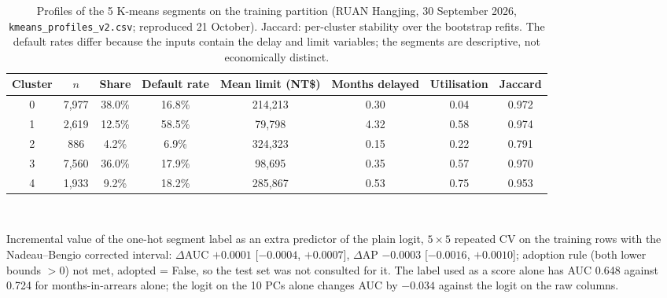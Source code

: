 \begin{table}[!htbp]
  \caption{Profiles of the 5 K-means segments on the training partition (RUAN Hangjing, 30 September 2026, \texttt{kmeans\_profiles\_v2.csv}; reproduced 21 October). Jaccard: per-cluster stability over the bootstrap refits. The default rates differ because the inputs contain the delay and limit variables; the segments are descriptive, not economically distinct.}
  \label{tab:a-kprofiles}
  \centering
  \small
  \setlength{\tabcolsep}{4pt}
  \begin{tabular}{@{}cccccccc@{}}
    \toprule
    Cluster & $n$ & Share & Default rate & Mean limit (NT\$) & Months delayed & Utilisation & Jaccard \\
    \midrule
    0 & 7,977 & 38.0\% & 16.8\% & 214,213 & 0.30 & 0.04 & 0.972 \\
    1 & 2,619 & 12.5\% & 58.5\% & 79,798 & 4.32 & 0.58 & 0.974 \\
    2 & 886 & 4.2\% & 6.9\% & 324,323 & 0.15 & 0.22 & 0.791 \\
    3 & 7,560 & 36.0\% & 17.9\% & 98,695 & 0.35 & 0.57 & 0.970 \\
    4 & 1,933 & 9.2\% & 18.2\% & 285,867 & 0.53 & 0.75 & 0.953 \\
    \bottomrule
  \end{tabular}
  \\[3pt]\begin{minipage}{\linewidth}\footnotesize Incremental value of the one-hot segment label as an extra predictor of the plain logit, $5\times5$ repeated CV on the training rows with the Nadeau--Bengio corrected interval: $\Delta$AUC $+0.0001$ [$-0.0004$, $+0.0007$], $\Delta$AP $-0.0003$ [$-0.0016$, $+0.0010$]; adoption rule (both lower bounds $> 0$) not met, adopted = False, so the test set was not consulted for it. The label used as a score alone has AUC 0.648 against 0.724 for months-in-arrears alone; the logit on the 10 PCs alone changes AUC by $-0.034$ against the logit on the raw columns.\end{minipage}
\end{table}

